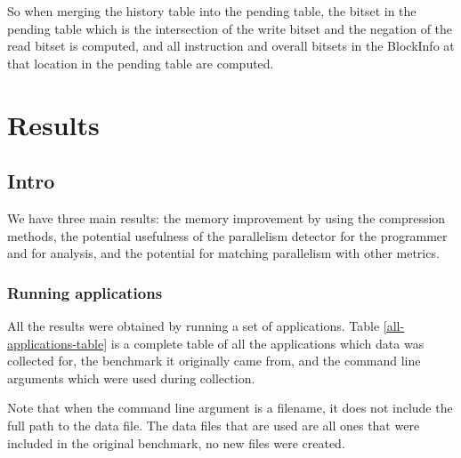 \documentclass[12pt,twoside]{reedthesis}
\begin{document}
			
			So when merging the history table into the pending table, the bitset in the pending table which is the intersection of the write bitset and the negation of the read bitset is computed, and all instruction and overall bitsets in the BlockInfo at that location in the pending table are computed. 
			
\chapter{Results}
	
		\section{Intro}
	
		We have three main results: the memory improvement by using the compression methods, the potential usefulness of the parallelism detector for the programmer and for analysis, and the potential for matching parallelism with other metrics.
	
		\subsection{Running applications}
		
		All the results were obtained by running a set of applications.
		Table \ref{all-applications-table} is a complete table of all the applications which data was collected for, the benchmark it originally came from, and the command line arguments which were used during collection. 
		
		Note that when the command line argument is a filename, it does not include the full path to the data file. The data files that are used are all ones that were included in the original benchmark, no new files were created. 
		
\end{document}
